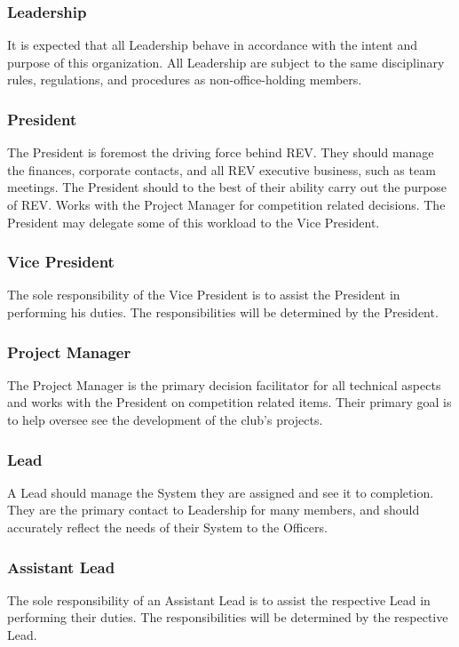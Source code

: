 \subsubsection{Leadership}
\label{roles:responsibilities:leadership}

It is expected that all Leadership behave in accordance with the intent and purpose of this organization. All Leadership are subject to the same disciplinary rules, regulations, and procedures as non-office-holding members.

\subsubsection{President}
\label{roles:responsibilities:president}

The President is foremost the driving force behind REV. They should manage the finances, corporate contacts, and all REV executive business, 
such as team meetings. The President should to the best of their ability carry out the purpose of REV. Works with the Project Manager 
for competition related decisions. The President may delegate some of this workload to the Vice President.

\subsubsection{Vice President}
\label{roles:responsibilities:vice}

The sole responsibility of the Vice President is to assist the President in performing his duties. The responsibilities will be determined by the President.

\subsubsection{Project Manager}
\label{roles:responsibilities:pm}

The Project Manager is the primary decision facilitator for all technical aspects and works with the President 
on competition related items. Their primary goal is to help oversee see the development of the club's projects.

\subsubsection{Lead}
\label{roles:responsibilities:lead}

A Lead should manage the System they are assigned and see it to completion. They are the primary contact to Leadership for many members, 
and should accurately reflect the needs of their System to the Officers.

\subsubsection{Assistant Lead}
\label{roles:responsibilities:assistant}

The sole responsibility of an Assistant Lead is to assist the respective Lead in performing their duties. The responsibilities will be determined by the respective Lead.